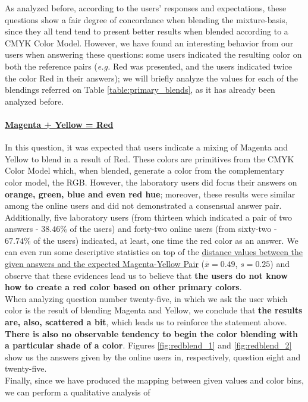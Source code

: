 %
As analyzed before, according to the users' responses and expectations, these questions show a fair degree of concordance when blending the mixture-basis, since they all tend tend to present better results when
blended according to a CMYK Color Model. However, we have found an interesting behavior from our users when answering these questions: some users indicated the resulting color on both the reference pairs (\emph{e.g.}
Red was presented, and the users indicated twice the color Red in their answers); we will briefly analyze the values for each of the blendings referred on Table \ref{table:primary_blends}, as it has already been
analyzed before.
%
\paragraph{\ul{Magenta + Yellow = Red}}
%
In this question, it was expected that users indicate a mixing of Magenta and Yellow to blend in a result of Red. These colors are primitives from the CMYK Color Model which, when blended, generate a color from the
complementary color model, the RGB. However, the laboratory users did focus their answers on \textbf{orange, green, blue and even red hue}; moreover, these results were similar among the online users and did not
demonstrated a consensual answer pair. \\
%
Additionally, five laboratory users (from thirteen which indicated a pair of two answers - $38.46\%$ of the users) and forty-two online users (from sixty-two - $67.74\%$ of the users) indicated, at least, one time the
red color as an answer. We can even run some descriptive statistics on top of the \ul{distance values between the given answers and the expected Magenta-Yellow Pair} ($\overline{x} = 0.49$, $s = 0.25$) and observe that
these evidences lead us to believe that \textbf{the users do not know how to create a red color based on other primary colors}. \\
%
When analyzing question number twenty-five, in which we ask the user which color is the result of blending Magenta and Yellow, we conclude that \textbf{the results are, also,
scattered a bit}, which leads us to reinforce the statement above. \textbf{There is also no observable tendency to begin the color blending with a particular shade of a color}. Figures \ref{fig:redblend_1} and
\ref{fig:redblend_2} show us the answers given by the online users in, respectively, question eight and twenty-five. \\
%
Finally, since we have produced the mapping between given values and color bins, we can perform a qualitative analysis of
